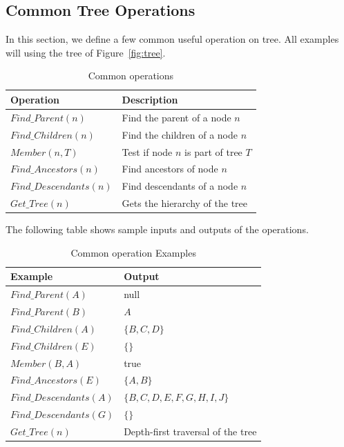 \subsection{Common Tree Operations}

In this section, we define a few common useful operation on tree. All examples will using the tree of Figure~\ref{fig:tree}.

\begin{table}[h]
\centering
\begin{tabular}{|l|l|}
\hline
{\bf Operation} & {\bf Description} \\ \hline\hline
$Find\_Parent(n)$ & Find the parent of a node $n$ \\
$Find\_Children(n)$ & Find the children of a node $n$\\
$Member(n, T)$ & Test if node $n$ is part of tree $T$\\
$Find\_Ancestors(n)$ & Find ancestors of node $n$\\
$Find\_Descendants(n)$ & Find descendants of a node $n$\\
$Get\_Tree(n)$ & Gets the hierarchy of the tree\\
\hline
\end{tabular}
\caption{Common operations\label{table:common_operations}}
\end{table}

The following table shows sample inputs and outputs of the operations.

\begin{table}[ht]
\centering
\begin{tabular}{|l|l|}
\hline
{\bf Example} & {\bf Output} \\ \hline\hline
$Find\_Parent(A)$ & null \\
$Find\_Parent(B)$ & $A$ \\
\hline
$Find\_Children(A)$ & $\{B, C, D\}$\\
$Find\_Children(E)$ & $\{\}$\\
\hline
$Member(B, A)$ & true \\
\hline
$Find\_Ancestors(E)$ & $\{A, B\}$\\
$Find\_Descendants(A)$ & $\{B, C, D, E, F, G, H, I, J\}$\\
$Find\_Descendants(G)$ & $\{\}$\\
$Get\_Tree(n)$ & Depth-first traversal of the tree\\
\hline
\end{tabular}
\caption{Common operation Examples\label{table:common_operation_examples}}
\end{table}

